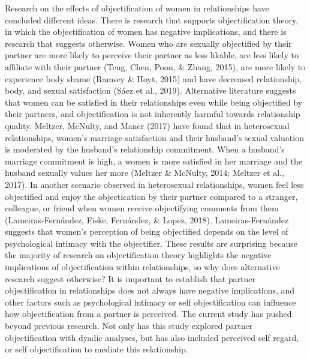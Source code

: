 \documentclass[
  man]{apa6}
\begin{document}
Research on the effects of objectification of women in relationships have concluded different ideas. There is research that supports objectification theory, in which the objectification of women has negative implications, and there is research that suggests otherwise. Women who are sexually objectified by their partner are more likely to perceive their partner as less likable, are less likely to affiliate with their partner (Teng, Chen, Poon, \& Zhang, 2015), are more likely to experience body shame (Ramsey \& Hoyt, 2015) and have decreased relationship, body, and sexual satisfaction (Sáez et al., 2019). Alternative literature suggests that women can be satisfied in their relationships even while being objectified by their partners, and objectification is not inherently harmful towards relationship quality. Meltzer, McNulty, and Maner (2017) have found that in heterosexual relationships, women's marriage satisfaction and their husband's sexual valuation is moderated by the husband's relationship commitment. When a husband's marriage commitment is high, a women is more satisfied in her marriage and the husband sexually values her more (Meltzer \& McNulty, 2014; Meltzer et al., 2017). In another scenario observed in heterosexual relationships, women feel less objectified and enjoy the objectication by their partner compared to a stranger, colleague, or friend when women receive objectifying comments from them (Lameiras-Fernández, Fiske, Fernández, \& Lopez, 2018). Lameiras-Fernández suggests that women's perception of being objectified depends on the level of psychological intimacy with the objectifier. These results are surprising because the majority of research on objectification theory highlights the negative implications of objectification within relationships, so why does alternative research suggest otherwise? It is important to establish that partner objectification in relationships does not always have negative implications, and other factors such as psychological intimacy or self objectification can influence how objectification from a partner is perceived. The current study has pushed beyond previous research. Not only has this study explored partner objectification with dyadic analyses, but has also included perceived self regard, or self objectification to mediate this relationship.
\end{document}
